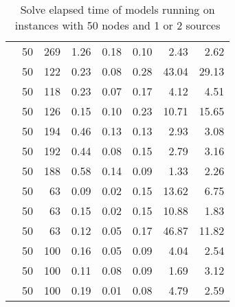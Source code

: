 \begin{table}[]
\begin{tabular}{rrrrrrrr}
                    & 50    & 269   & 1.26    & 0.18    & 0.10    & 2.43    & 2.62    \\
                    & 50    & 122   & 0.23    & 0.08    & 0.28    & 43.04   & 29.13   \\
                    & 50    & 118   & 0.23    & 0.07    & 0.17    & 4.12    & 4.51    \\
                    & 50    & 126   & 0.15    & 0.10    & 0.23    & 10.71   & 15.65   \\
                    & 50    & 194   & 0.46    & 0.13    & 0.13    & 2.93    & 3.08    \\
                    & 50    & 192   & 0.44    & 0.08    & 0.15    & 2.79    & 3.16    \\
                    & 50    & 188   & 0.58    & 0.14    & 0.09    & 1.33    & 2.26    \\
                    & 50    & 63    & 0.09    & 0.02    & 0.15    & 13.62   & 6.75    \\
                    & 50    & 63    & 0.15    & 0.02    & 0.15    & 10.88   & 1.83    \\
                    & 50    & 63    & 0.12    & 0.05    & 0.17    & 46.87   & 11.82   \\
                    & 50    & 100   & 0.16    & 0.05    & 0.09    & 4.04    & 2.54    \\
                    & 50    & 100   & 0.11    & 0.08    & 0.09    & 1.69    & 3.12    \\
                    & 50    & 100   & 0.19    & 0.01    & 0.08    & 4.79    & 2.59   
\end{tabular}
\caption{Solve elapsed time of models running on instances with 50 nodes and 1 or 2 sources}
\label{tab:time:50}
\end{table}



